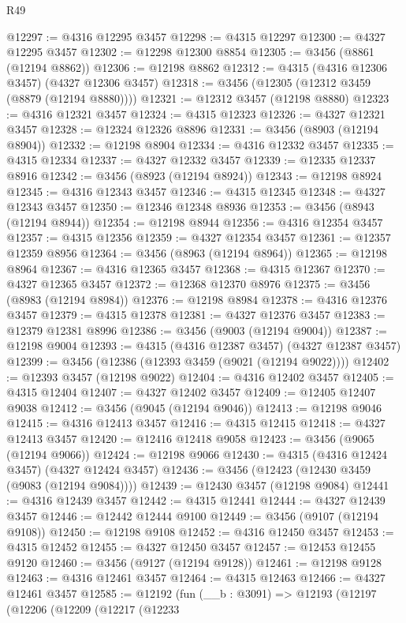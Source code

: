 \begin{lexlean}{R49}
\begin{coremodule}
@12297 := @4316 @12295 @3457
@12298 := @4315 @12297
@12300 := @4327 @12295 @3457
@12302 := @12298 @12300 @8854
@12305 := @3456 (@8861 (@12194 @8862))
@12306 := @12198 @8862
@12312 := @4315 (@4316 @12306 @3457) (@4327 @12306 @3457)
@12318 := @3456 (@12305 (@12312 @3459 (@8879 (@12194 @8880))))
@12321 := @12312 @3457 (@12198 @8880)
@12323 := @4316 @12321 @3457
@12324 := @4315 @12323
@12326 := @4327 @12321 @3457
@12328 := @12324 @12326 @8896
@12331 := @3456 (@8903 (@12194 @8904))
@12332 := @12198 @8904
@12334 := @4316 @12332 @3457
@12335 := @4315 @12334
@12337 := @4327 @12332 @3457
@12339 := @12335 @12337 @8916
@12342 := @3456 (@8923 (@12194 @8924))
@12343 := @12198 @8924
@12345 := @4316 @12343 @3457
@12346 := @4315 @12345
@12348 := @4327 @12343 @3457
@12350 := @12346 @12348 @8936
@12353 := @3456 (@8943 (@12194 @8944))
@12354 := @12198 @8944
@12356 := @4316 @12354 @3457
@12357 := @4315 @12356
@12359 := @4327 @12354 @3457
@12361 := @12357 @12359 @8956
@12364 := @3456 (@8963 (@12194 @8964))
@12365 := @12198 @8964
@12367 := @4316 @12365 @3457
@12368 := @4315 @12367
@12370 := @4327 @12365 @3457
@12372 := @12368 @12370 @8976
@12375 := @3456 (@8983 (@12194 @8984))
@12376 := @12198 @8984
@12378 := @4316 @12376 @3457
@12379 := @4315 @12378
@12381 := @4327 @12376 @3457
@12383 := @12379 @12381 @8996
@12386 := @3456 (@9003 (@12194 @9004))
@12387 := @12198 @9004
@12393 := @4315 (@4316 @12387 @3457) (@4327 @12387 @3457)
@12399 := @3456 (@12386 (@12393 @3459 (@9021 (@12194 @9022))))
@12402 := @12393 @3457 (@12198 @9022)
@12404 := @4316 @12402 @3457
@12405 := @4315 @12404
@12407 := @4327 @12402 @3457
@12409 := @12405 @12407 @9038
@12412 := @3456 (@9045 (@12194 @9046))
@12413 := @12198 @9046
@12415 := @4316 @12413 @3457
@12416 := @4315 @12415
@12418 := @4327 @12413 @3457
@12420 := @12416 @12418 @9058
@12423 := @3456 (@9065 (@12194 @9066))
@12424 := @12198 @9066
@12430 := @4315 (@4316 @12424 @3457) (@4327 @12424 @3457)
@12436 := @3456 (@12423 (@12430 @3459 (@9083 (@12194 @9084))))
@12439 := @12430 @3457 (@12198 @9084)
@12441 := @4316 @12439 @3457
@12442 := @4315 @12441
@12444 := @4327 @12439 @3457
@12446 := @12442 @12444 @9100
@12449 := @3456 (@9107 (@12194 @9108))
@12450 := @12198 @9108
@12452 := @4316 @12450 @3457
@12453 := @4315 @12452
@12455 := @4327 @12450 @3457
@12457 := @12453 @12455 @9120
@12460 := @3456 (@9127 (@12194 @9128))
@12461 := @12198 @9128
@12463 := @4316 @12461 @3457
@12464 := @4315 @12463
@12466 := @4327 @12461 @3457
@12585 := @12192
    (fun (__b : @3091) =>
    @12193
      (@12197
        (@12206
          (@12209
            (@12217
              (@12233

\end{coremodule}
\end{lexlean}
